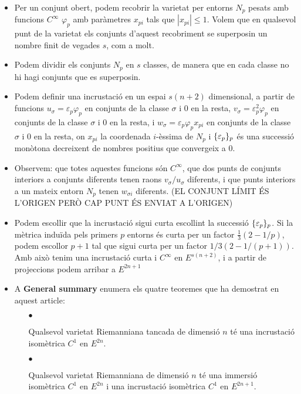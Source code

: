 {\begin{itemize}
    \item Per un conjunt obert, podem recobrir la varietat per entorns $N_p$ pesats amb funcions $C^\infty$ $\varphi_p$ amb paràmetres $x_{pi}$ tals que $|x_{pi}|\le1$. Volem que en qualsevol punt de la varietat els conjunts d'aquest recobriment se superposin un nombre finit de vegades $s$, com a molt.
    \item Podem dividir els conjunts $N_p$ en $s$ classes, de manera que en cada classe no hi hagi conjunts que es superposin. 
    \item Podem definir una incrustació en un espai $s(n+2)$ dimensional, a partir de funcions $u_\sigma=\varepsilon_p\varphi_p$ en conjunts de la classe $\sigma$ i $0$ en la resta, $v_\sigma=\varepsilon^2_p\varphi_p$ en conjunts de la classe $\sigma$ i $0$ en la resta, i $w_\sigma=\varepsilon_p\varphi_px_{pi}$ en conjunts de la classe $\sigma$ i $0$ en la resta, on $x_{pi}$ la coordenada $i$-èssima de $N_p$ i $\{\varepsilon_p\}_p$ és una successió monòtona decreixent de nombres positius que convergeix a $0$.
    \item Observem: que totes aquestes funcions són $C^\infty$, que dos punts de conjunts interiors a conjunts diferents tenen raons $v_\sigma/u_\sigma$ diferents, i que punts interiors a un mateix entorn $N_p$ tenen $w_{\sigma i}$ diferents. (EL CONJUNT LÍMIT ÉS L'ORIGEN PERÒ CAP PUNT ÉS ENVIAT A L'ORIGEN)
    \item Podem escollir que la incrustació sigui curta escollint la successió $\{\varepsilon_p\}_p$. Si la mètrica induïda pels primers $p$ entorns és curta per un factor $\frac13(2-1/p)$, podem escollor $p+1$ tal que sigui curta per un factor $1/3(2-1/(p+1))$. Amb això tenim una incrustació curta i $C^\infty$ en $E^{s(n+2)}$, i a partir de projeccions podem arribar a $E^{2n+1}$
    \item A \textbf{General summary} enumera els quatre teoremes que ha demostrat en aquest article:
    \begin{itemize}
        \item[$\bullet$] \begin{teo}
            Qualsevol varietat Riemanniana tancada de dimensió $n$ té una incrustació isomètrica $C^1$ en $E^{2n}$.
        \end{teo}
        \item[$\bullet$] \begin{teo}
            Qualsevol varietat Riemanniana de dimensió $n$ té una immersió isomètrica $C^1$ en $E^{2n}$ i una incrustació isomètrica $C^1$ en $E^{2n+1}$.

\end{teo}
\end{itemize}
\end{itemize}}
